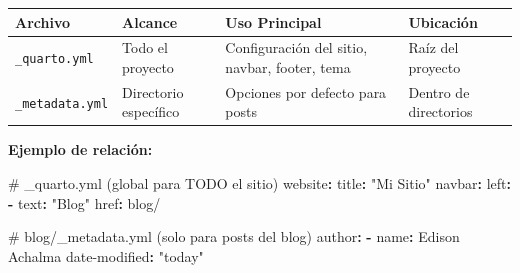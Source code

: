 \documentclass[
  doc,
  floatsintext,
  longtable,
  a4paper,
  nolmodern,
  notxfonts,
  notimes,
  12pt,
  colorlinks=true,linkcolor=blue,citecolor=blue,urlcolor=blue]{apa7}
\newenvironment{Shaded}{\begin{snugshade}}{\end{snugshade}}
\newcommand{\AlertTok}[1]{\textcolor[rgb]{0.68,0.00,0.00}{#1}}
\newcommand{\AttributeTok}[1]{\textcolor[rgb]{0.40,0.45,0.13}{#1}}
\newcommand{\CommentTok}[1]{\textcolor[rgb]{0.37,0.37,0.37}{#1}}
\newcommand{\FunctionTok}[1]{\textcolor[rgb]{0.28,0.35,0.67}{#1}}
\newcommand{\KeywordTok}[1]{\textcolor[rgb]{0.00,0.23,0.31}{\textbf{#1}}}
\newcommand{\StringTok}[1]{\textcolor[rgb]{0.13,0.47,0.30}{#1}}
\newcounter{none} %
\begin{document}
{\def\LTcaptype{none} %
\begin{longtable}[]{@{}
  >{\raggedright\arraybackslash}p{}
  >{\raggedright\arraybackslash}p{}
  >{\raggedright\arraybackslash}p{}
  >{\raggedright\arraybackslash}p{}@{}}
\toprule\noalign{}
\begin{minipage}[b]{\linewidth}\raggedright
Archivo
\end{minipage} & \begin{minipage}[b]{\linewidth}\raggedright
Alcance
\end{minipage} & \begin{minipage}[b]{\linewidth}\raggedright
Uso Principal
\end{minipage} & \begin{minipage}[b]{\linewidth}\raggedright
Ubicación
\end{minipage} \\
\midrule\noalign{}
\endhead
\bottomrule\noalign{}
\endlastfoot
\texttt{\_quarto.yml} & Todo el proyecto & Configuración del sitio,
navbar, footer, tema & Raíz del proyecto \\
\texttt{\_metadata.yml} & Directorio específico & Opciones por defecto
para posts & Dentro de directorios \\
\end{longtable}
}

\textbf{Ejemplo de relación:}

\begin{Shaded}
\begin{Highlighting}[]
\CommentTok{\# \_quarto.yml (global para }\AlertTok{TODO}\CommentTok{ el sitio)}
\FunctionTok{website}\KeywordTok{:}
\AttributeTok{  }\FunctionTok{title}\KeywordTok{:}\AttributeTok{ }\StringTok{"Mi Sitio"}
\AttributeTok{  }\FunctionTok{navbar}\KeywordTok{:}
\AttributeTok{    }\FunctionTok{left}\KeywordTok{:}
\AttributeTok{      }\KeywordTok{{-}}\AttributeTok{ }\FunctionTok{text}\KeywordTok{:}\AttributeTok{ }\StringTok{"Blog"}
\AttributeTok{        }\FunctionTok{href}\KeywordTok{:}\AttributeTok{ blog/}

\CommentTok{\# blog/\_metadata.yml (solo para posts del blog)}
\FunctionTok{author}\KeywordTok{:}
\AttributeTok{  }\KeywordTok{{-}}\AttributeTok{ }\FunctionTok{name}\KeywordTok{:}\AttributeTok{ Edison Achalma}
\FunctionTok{date{-}modified}\KeywordTok{:}\AttributeTok{ }\StringTok{"today"}
\end{Highlighting}
\end{Shaded}
\end{document}
